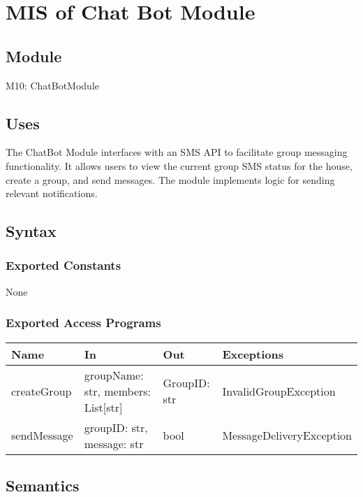 \documentclass[12pt, titlepage]{article}
\begin{document}
\newpage


\section{MIS of Chat Bot Module} \label{Module}
 
\subsection{Module}

M10: ChatBotModule

\subsection{Uses}

The ChatBot Module interfaces with an SMS API to facilitate group messaging functionality. It allows users to view the current group SMS status for the house, create a group, and send messages. The module implements logic for sending relevant notifications.

\subsection{Syntax}

\subsubsection{Exported Constants}
None

\subsubsection{Exported Access Programs}

\begin{center}
\begin{tabular}{p{3cm} p{5cm} p{3cm} p{5cm}}
\hline
\textbf{Name} & \textbf{In} & \textbf{Out} & \textbf{Exceptions} \\
\hline
createGroup & groupName: str, members: List[str] & GroupID: str & InvalidGroupException \\
sendMessage & groupID: str, message: str & bool & MessageDeliveryException \\
\hline
\end{tabular}
\end{center}

\subsection{Semantics}
\end{document}
